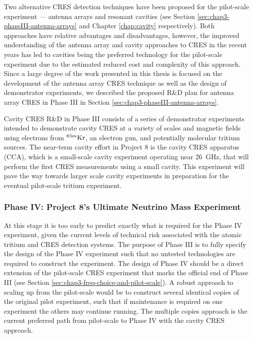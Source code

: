 Two alternative CRES detection techniques have been proposed for the pilot-scale experiment --- antenna arrays and resonant cavities (see Section \ref{sec:chap3-phaseIII-antenna-arrays} and Chapter \ref{chap:cavity} respectively). Both approaches have relative advantages and disadvantages, however, the improved understanding of the antenna array and cavity approaches to CRES in the recent years has led to cavities being the preferred technology for the pilot-scale experiment due to the estimated reduced cost and complexity of this approach. Since a large degree of the work presented in this thesis is focused on the development of the antenna array CRES technique as well as the design of demonstrator experiments, we described the proposed R\&D plan for antenna array CRES in Phase III in Section \ref{sec:chap3-phaseIII-antenna-arrays}. 

Cavity CRES R\&D in Phase III consists of a series of demonstrator experiments intended to demonstrate cavity CRES at a variety of scales and magnetic fields using electrons from $^{83m}\rm{Kr}$, an electron gun, and potentially molecular tritium sources. The near-term cavity effort in Project 8 is the cavity CRES apparatus (CCA), which is a small-scale cavity experiment operating near 26~GHz, that will perform the first CRES measurements using a small cavity. This experiment will pave the way towards larger scale cavity experiments in preparation for the eventual pilot-scale tritium experiment.

\subsubsection*{Phase IV: Project 8's Ultimate Neutrino Mass Experiment}

At this stage it is too early to predict exactly what is required for the Phase IV experiment, given the current levels of technical risk associated with the atomic tritium and CRES detection systems. The purpose of Phase III is to fully specify the design of the Phase IV experiment such that no untested technologies are required to construct the experiment. The design of Phase IV should be a direct extension of the pilot-scale CRES experiment that marks the official end of Phase III (see Section \ref{sec:chap3-freq-choice-and-pilot-scale}). A robust approach to scaling up from the pilot-scale would be to construct several identical copies of the original pilot experiment, such that if maintenance is required on one experiment the others may continue running. The multiple copies approach is the current preferred path from pilot-scale to Phase IV with the cavity CRES approach.

